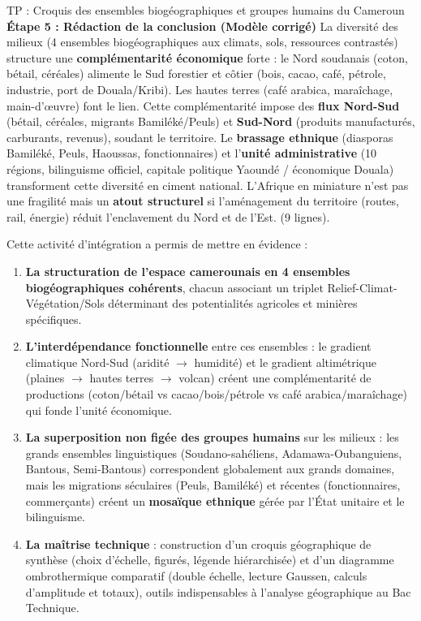 \documentclass[11pt]{article}
\newcounter{popsec}
\newcounter{popsub}
\newcommand{\courssub}[1]{%
  \stepcounter{popsub}%
  \par\vspace{9pt}\noindent{\popxbold\fontsize{11.5}{13}\selectfont\color{popink}{\color{poporange}\thepopsec.\thepopsub}\hspace{6pt}#1}\par\nopagebreak\vspace{4pt}
}
\begin{document}
\begin{exoresolu}{TP : Croquis des ensembles biogéographiques et groupes humains du Cameroun}
\textbf{Étape 5 : Rédaction de la conclusion (Modèle corrigé)}
\og La diversité des milieux (4 ensembles biogéographiques aux climats, sols, ressources contrastés) structure une \textbf{complémentarité économique} forte : le Nord soudanais (coton, bétail, céréales) alimente le Sud forestier et côtier (bois, cacao, café, pétrole, industrie, port de Douala/Kribi). Les hautes terres (café arabica, maraîchage, main-d'œuvre) font le lien. Cette complémentarité impose des \textbf{flux Nord-Sud} (bétail, céréales, migrants Bamiléké/Peuls) et \textbf{Sud-Nord} (produits manufacturés, carburants, revenus), soudant le territoire. Le \textbf{brassage ethnique} (diasporas Bamiléké, Peuls, Haoussas, fonctionnaires) et l'\textbf{unité administrative} (10 régions, bilinguisme officiel, capitale politique Yaoundé / économique Douala) transforment cette diversité en ciment national. L'\og Afrique en miniature \fg{} n'est pas une fragilité mais un \textbf{atout structurel} si l'aménagement du territoire (routes, rail, énergie) réduit l'enclavement du Nord et de l'Est. \fg{} (9 lignes).
\end{exoresolu}

\courssub{Bilan de l'activité}
Cette activité d'intégration a permis de mettre en évidence :
\begin{enumerate}
    \item \textbf{La structuration de l'espace camerounais en 4 ensembles biogéographiques cohérents}, chacun associant un triplet Relief-Climat-Végétation/Sols déterminant des potentialités agricoles et minières spécifiques.
    \item \textbf{L'interdépendance fonctionnelle} entre ces ensembles : le gradient climatique Nord-Sud (aridité $\rightarrow$ humidité) et le gradient altimétrique (plaines $\rightarrow$ hautes terres $\rightarrow$ volcan) créent une complémentarité de productions (coton/bétail vs cacao/bois/pétrole vs café arabica/maraîchage) qui fonde l'unité économique.
    \item \textbf{La superposition non figée des groupes humains} sur les milieux : les grands ensembles linguistiques (Soudano-sahéliens, Adamawa-Oubanguiens, Bantous, Semi-Bantous) correspondent globalement aux grands domaines, mais les migrations séculaires (Peuls, Bamiléké) et récentes (fonctionnaires, commerçants) créent un \textbf{mosaïque ethnique} gérée par l'État unitaire et le bilinguisme.
    \item \textbf{La maîtrise technique} : construction d'un croquis géographique de synthèse (choix d'échelle, figurés, légende hiérarchisée) et d'un diagramme ombrothermique comparatif (double échelle, lecture Gaussen, calculs d'amplitude et totaux), outils indispensables à l'analyse géographique au Bac Technique.
\end{enumerate}
\end{document}
